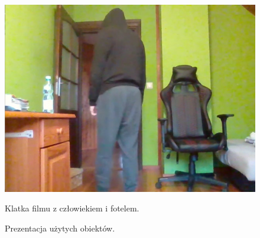 \begin{figure}[H]
\begin{minipage}{0.32\textwidth}
        \includegraphics[width=\linewidth]{r_test_dokładności/vid_pics/1g_2.jpg}
        \caption{Klatka filmu z człowiekiem i fotelem.}
    \end{minipage}
    \caption{Prezentacja użytych obiektów.}
    \label{fig:all_objects}
\end{figure}